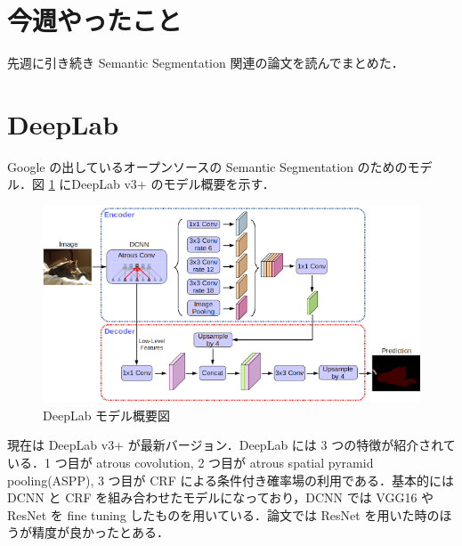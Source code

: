 \documentclass[onecolumn]{ujarticle}   %
\begin{document}
	
	\section{今週やったこと}
	先週に引き続き Semantic Segmentation 関連の論文を読んでまとめた．
	
	\section{DeepLab \cite{DBLP:journals/corr/ChenPK0Y16, DBLP:journals/corr/abs-1802-02611}}
	Google の出しているオープンソースの Semantic Segmentation のためのモデル．図 \ref{fig:deeplab} にDeepLab v3+ のモデル概要を示す．
	
	\begin{figure}[h]
		\begin{center}
			\includegraphics[width=120mm]{deeplab.png}
			\caption{DeepLab モデル概要図}
			\label{fig:deeplab}
		\end{center}
	\end{figure}
	
	現在は DeepLab v3+ が最新バージョン．DeepLab には 3 つの特徴が紹介されている．1 つ目が atrous covolution, 2 つ目が atrous spatial pyramid pooling(ASPP), 3 つ目が CRF による条件付き確率場の利用である．基本的には DCNN と CRF を組み合わせたモデルになっており，DCNN では VGG16 や ResNet を fine tuning したものを用いている．論文では ResNet を用いた時のほうが精度が良かったとある．
	
\end{document}
